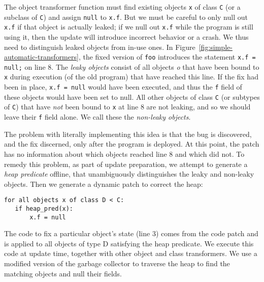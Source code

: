 The object transformer function must find existing objects \texttt{x} of
class \texttt{C} (or a subclass of \texttt{C}) and assign \texttt{null} to
\texttt{x.f}.  But we must be careful to only null out \texttt{x.f} if that
object is actually leaked; if we null out \texttt{x.f} while the program is
still using it, then the update will introduce incorrect behavior or
a crash.  We thus need to distinguish leaked objects from in-use ones. In
Figure~\ref{fig:simple-automatic-transformers}, the fixed version of
\texttt{foo} introduces the statement \texttt{x.f = null;} on line 8.  The
\emph{leaky objects} consist of all objects \emph{o} that have been bound
to \texttt{x} during execution (of the old program) that have reached this
line.  If the fix had been in place, \texttt{x.f = null} would have been
executed, and thus the \texttt{f} field of these objects would have been
set to null.  All other objects of class \texttt{C} (or subtypes of
\texttt{C}) that have \emph{not} been bound to \texttt{x} at line 8 are not
leaking, and so we should leave their \texttt{f} field alone.  We
call these the \emph{non-leaky objects}.

The problem with literally implementing this idea is that the bug is
discovered, and the fix discerned, only after the program is deployed.  At
this point, the patch has no information about which objects reached line 8
and which did not. To remedy this problem, as part of update preparation, we attempt to generate a
\emph{heap predicate} offline, that unambiguously distinguishes the leaky and
non-leaky objects. Then we
generate a dynamic patch to correct the heap:

\begin{center}
\begin{minipage}{0.53\textwidth}
\begin{lstlisting}[frame=single]
for all objects x of class D < C:
   if heap_pred(x):
       x.f = null
\end{lstlisting}
\end{minipage}
\end{center}

The code to fix a particular object's state (line 3) comes from the code
patch and is applied to all objects of type D satisfying the heap
predicate.  We execute this code at update time, together with other object
and class transformers. We use a modified version
of the \JV garbage collector to traverse the heap to find the matching
objects and null their fields.

